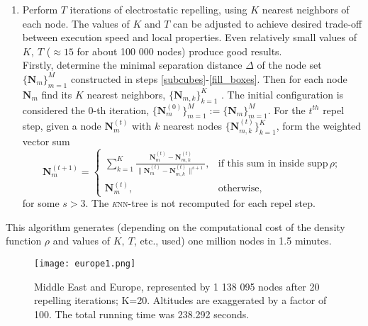 \documentclass[10pt]{amsart}
\begin{document}
\begin{enumerate}
	\item Perform $ T $ iterations of electrostatic repelling, using $ K $ nearest neighbors of each node. The values of $ K $ and $ T $ can be adjusted to achieve desired trade-off between execution speed and local properties. Even relatively small values of $ K,\ T $ ($ \approx 15 $ for about 100 000 nodes) produce good results. \\
	Firstly, determine the minimal separation distance $ \Delta $ of the node set $ \{\boldsymbol{N}_m\}_{m=1}^M $ constructed in steps \eqref{subcubes}-\eqref{fill_boxes}. Then for each node $ \boldsymbol{N}_m $ find its $ K $ nearest neighbors, $ \{\boldsymbol{N}_{m,k}\}_{k=1}^K $ . The initial configuration is considered the $ 0 $-th iteration, $ \{\boldsymbol{N}_m^{(0)}\}_{m=1}^M := \{\boldsymbol{N}_m\}_{m=1}^M $. For the $t^{th}$ repel step, given a node $\boldsymbol{N}_m^{(t)}$ with $ k $ nearest nodes $\{ \boldsymbol{N}_{m,k}^{(t)}\}_{k=1}^K$, form the weighted vector sum
	\[\boldsymbol{N}_m^{(t+1)} = \begin{cases}
	\sum_{k=1}^{K}\frac{\boldsymbol{N}_m^{(t)}-\boldsymbol{N}_{m,k}^{(t)} }{\|\boldsymbol{N}_m^{(t)}-\boldsymbol{N}_{m,k}^{(t)} \|^{s+1}}, &\text{if this sum in inside }\text{supp}\,\rho; \\
	\boldsymbol{N}_m^{(t)}, &\text{otherwise,}
	\end{cases} \]
	for some $s>3$.
	The \textsc{\textit{k}nn}-tree is not recomputed for each repel step.
\end{enumerate}
This algorithm generates (depending on the computational cost of the density function $ \rho $ and values of $ K,\  T$, etc., used) one million nodes in 1.5 minutes.

\begin{figure}
	\centering
	\texttt{[image: europe1.png]}
	\caption{Middle East and Europe, represented by 1 138 095 nodes after 20 repelling iterations; K=20. Altitudes are exaggerated by a factor of 100. The total running time was 238.292 seconds.}
	\label{europe}
\end{figure}


\end{document}
